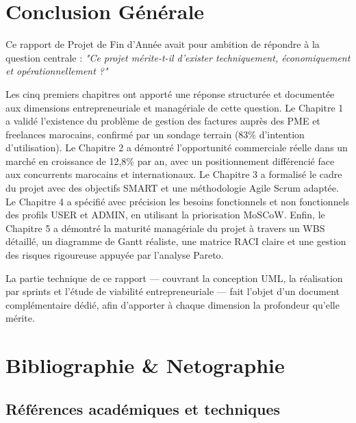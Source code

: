\documentclass[12pt,a4paper]{report}
\begin{document}
\chapter*{Conclusion Générale}

Ce rapport de Projet de Fin d'Année avait pour ambition de répondre à la question centrale : \textit{"Ce projet mérite-t-il d'exister techniquement, économiquement et opérationnellement ?"}

Les cinq premiers chapitres ont apporté une réponse structurée et documentée aux dimensions entrepreneuriale et managériale de cette question. Le Chapitre 1 a validé l'existence du problème de gestion des factures auprès des PME et freelances marocains, confirmé par un sondage terrain (83\% d'intention d'utilisation). Le Chapitre 2 a démontré l'opportunité commerciale réelle dans un marché en croissance de 12,8\% par an, avec un positionnement différencié face aux concurrents marocains et internationaux. Le Chapitre 3 a formalisé le cadre du projet avec des objectifs SMART et une méthodologie Agile Scrum adaptée. Le Chapitre 4 a spécifié avec précision les besoins fonctionnels et non fonctionnels des profils USER et ADMIN, en utilisant la priorisation MoSCoW. Enfin, le Chapitre 5 a démontré la maturité managériale du projet à travers un WBS détaillé, un diagramme de Gantt réaliste, une matrice RACI claire et une gestion des risques rigoureuse appuyée par l'analyse Pareto.

La partie technique de ce rapport — couvrant la conception UML, la réalisation par sprints et l'étude de viabilité entrepreneuriale — fait l'objet d'un document complémentaire dédié, afin d'apporter à chaque dimension la profondeur qu'elle mérite.

\clearpage
\chapter*{Bibliographie \& Netographie}

\section*{Références académiques et techniques}
\end{document}
